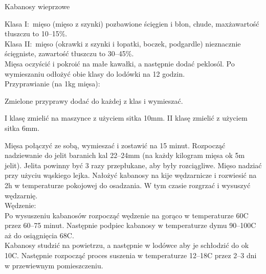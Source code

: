 \documentclass[a4paper,12pt]{article}
\begin{document}
\begin{recipe}{Kabanosy wieprzowe}{}{}


\freeform%
Klasa I:\ mięso  (mięso z szynki) pozbawione ścięgien i błon, chude, max\. zawartość tłuszczu to 10--15\%. \\
Klasa II:\ mięso (okrawki z szynki i łopatki, boczek, podgardle) nieznacznie ścięgniste, zawartość tłuszczu to 30--45\%. \\

Mięsa oczyścić i pokroić na małe kawałki, a następnie dodać peklosól.
Po wymieszaniu odłożyć obie klasy do lodówki na 12 godzin. \\

\freeform%
Przyprawianie (na 1kg mięsa):

Zmielone przyprawy dodać do każdej z klas i wymieszać.

I klasę zmielić na maszynce z użyciem sitka 10mm. 
II klasę zmielić z użyciem sitka 6mm.

\freeform%
Mięsa połączyć ze sobą, wymieszać i zostawić na 15 minut.
Rozpocząć nadziewanie do jelit baranich kal 22--24mm (na każdy kilogram mięsa ok 5m jelit).
Jelita powinny być 3 razy przepłukane, aby były rozciągliwe. Mięso nadziać przy użyciu wąskiego lejka.
Nałożyć kabanosy na kije wędzarnicze i rozwiesić na 2h w temperaturze pokojowej do osadzania.
W tym czasie rozgrzać i wysuszyć wędzarnię. \\

Wędzenie: \\
Po wysuszeniu kabanosów rozpocząć wędzenie na gorąco w temperaturze 60\0C przez 60--75 minut.
Następnie podpiec kabanosy w temperaturze dymu 90--100\0C aż do osiągnięcia 68\0C. \\

Kabanosy studzić na powietrzu, a następnie w lodówce aby je schłodzić do ok 10\0C.
Następnie rozpocząć proces suszenia w temperaturze 12--18\0C przez 2--3 dni w przewiewnym pomieszczeniu.


\end{recipe}
\end{document}

